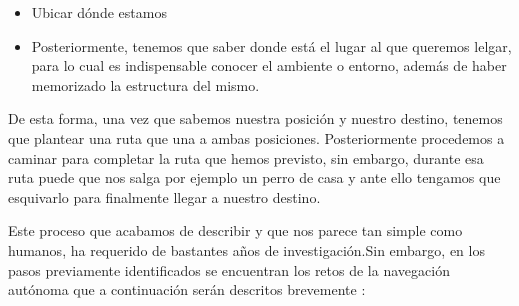 \documentclass[11pt]{article}
\begin{document}
\begin{itemize}
    \item Ubicar dónde estamos

    \item Posteriormente, tenemos que saber donde está el lugar al que queremos lelgar, para lo cual es indispensable conocer el ambiente o entorno, además de haber memorizado la estructura del mismo.
\end{itemize}

De esta forma, una vez que sabemos nuestra posición y nuestro destino, tenemos que plantear una ruta que una a ambas posiciones. Posteriormente procedemos a caminar para completar la ruta que hemos previsto, sin embargo, durante esa ruta puede que nos salga por ejemplo un perro de casa y ante ello tengamos que esquivarlo para finalmente llegar a nuestro destino.

Este proceso que acabamos de describir y que nos parece tan simple como humanos, ha requerido de bastantes años de investigación.Sin embargo, en los pasos previamente identificados se encuentran los retos de la navegación autónoma que a continuación serán descritos brevemente :
\end{document}
